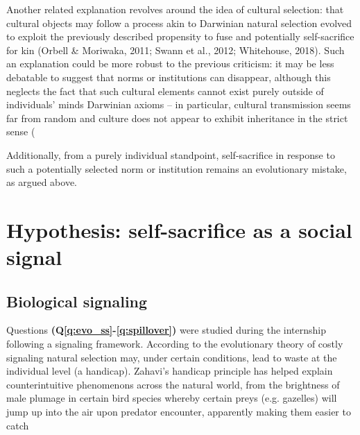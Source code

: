 \documentclass[a4paper,12pt]{report}
\begin{document}
Another related explanation revolves around the idea of cultural selection:
that cultural objects may follow a process akin to Darwinian natural selection
evolved to exploit the previously described propensity to fuse and potentially
self-sacrifice for kin (Orbell \& Moriwaka, 2011; Swann et al., 2012; Whitehouse, 2018).
Such an explanation could be more robust to the previous criticism: it may be less
debatable to suggest that norms or institutions can disappear, although this neglects
the fact that such cultural elements cannot exist purely outside of individuals’ minds
Darwinian axioms – in particular, cultural transmission seems far from random and
culture does not appear to exhibit inheritance in the strict sense
(%

Additionally, from a purely individual standpoint,
self-sacrifice in response to such a potentially selected norm or institution
remains an evolutionary mistake, as argued above.

\section{Hypothesis: self-sacrifice as a social signal}
\label{s:ss_sgl}
\subsection{Biological signaling}
Questions \textbf{(Q\ref{q:evo_ss}-\ref{q:spillover})} were studied during the internship 
following a signaling framework.
According to the evolutionary theory of costly signaling %
natural selection may, under certain conditions, lead to waste at the individual level
(a handicap). Zahavi’s handicap principle has helped explain counterintuitive phenomenons
across the natural world, from the brightness of male plumage in certain bird species
whereby certain preys (e.g. gazelles) will jump up into the air upon predator encounter,
apparently making them easier to catch %
\end{document}

